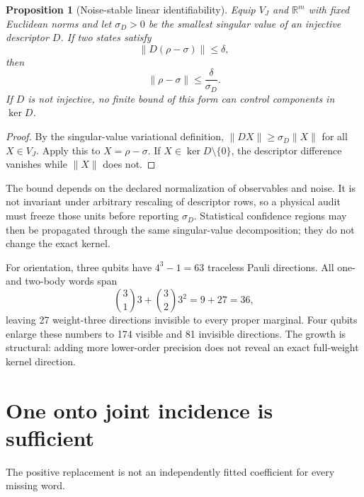 \documentclass[11pt]{article}
\newtheorem{proposition}{Proposition}
\begin{document}
\begin{proposition}[Noise-stable linear identifiability]
Equip \(V_J\) and \(\mathbb R^m\) with fixed Euclidean norms and let
\(\sigma_D>0\) be the smallest singular value of an injective descriptor
\(D\).  If two states satisfy
\begin{equation}
 \lVert D(\rho-\sigma)\rVert\le\delta,
 \label{eq:noisy-descriptor}
\end{equation}
then
\begin{equation}
 \lVert\rho-\sigma\rVert\le\frac{\delta}{\sigma_D}.
 \label{eq:descriptor-stability}
\end{equation}
If \(D\) is not injective, no finite bound of this form can control components
in \(\ker D\).
\end{proposition}
\begin{proof}
By the singular-value variational definition,
\(\lVert DX\rVert\ge\sigma_D\lVert X\rVert\) for all \(X\in V_J\).
Apply this to \(X=\rho-\sigma\).  If \(X\in\ker D\setminus\{0\}\), the
descriptor difference vanishes while \(\lVert X\rVert\) does not.
\end{proof}

The bound depends on the declared normalization of observables and noise.  It
is not invariant under arbitrary rescaling of descriptor rows, so a physical
audit must freeze those units before reporting \(\sigma_D\).  Statistical
confidence regions may then be propagated through the same singular-value
decomposition; they do not change the exact kernel.

For orientation, three qubits have \(4^3-1=63\) traceless Pauli directions.
All one- and two-body words span
\begin{equation}
 \binom{3}{1}3+\binom{3}{2}3^2=9+27=36,
\end{equation}
leaving 27 weight-three directions invisible to every proper marginal.  Four
qubits enlarge these numbers to 174 visible and 81 invisible directions.  The
growth is structural: adding more lower-order precision does not reveal an
exact full-weight kernel direction.

\section{One onto joint incidence is sufficient}

The positive replacement is not an independently fitted coefficient for every
missing word.
\end{document}
